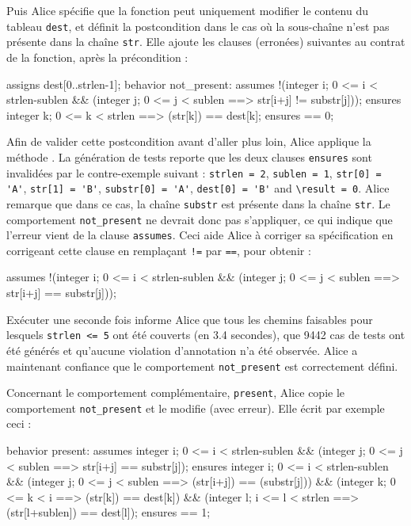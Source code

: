 Puis Alice spécifie que la fonction peut uniquement modifier le contenu du
tableau \lstinline'dest', et définit la postcondition dans le cas où la
sous-chaîne n'est pas présente dans la chaîne \lstinline'str'.
Elle ajoute les clauses (erronées) suivantes au contrat de la fonction, après
la précondition :

\begin{pretty-codeACSL}
assigns dest[0..strlen-1];
behavior not_present:
 assumes !(\exists integer i; 0 <= i < strlen-sublen && 
  (\forall integer j; 0 <= j < sublen ==> str[i+j] != substr[j]));
 ensures \forall integer k; 0 <= k < strlen ==> \old(str[k]) == dest[k];
 ensures \result == 0;
\end{pretty-codeACSL}

Afin de valider cette postcondition avant d'aller plus loin, Alice applique
la méthode \NCD.
La génération de tests reporte que les deux clauses \lstinline{ensures} sont
invalidées par le contre-exemple suivant :
\lstinline{strlen = 2}, \lstinline{sublen = 1}, \lstinline{str[0] = 'A'},
\lstinline{str[1] = 'B'}, \lstinline{substr[0] = 'A'}, 
\lstinline{dest[0] = 'B'} and \lstinline{\result = 0}.
Alice remarque que dans ce cas, la chaîne \lstinline{substr} est présente dans
la chaîne \lstinline'str'.
Le comportement \lstinline'not_present' ne devrait donc pas s'appliquer, ce qui
indique que l'erreur vient de la clause \lstinline'assumes'.
Ceci aide Alice à corriger sa spécification en corrigeant cette clause en
remplaçant \lstinline[style=pretty-c]{!=} par \lstinline{==}, pour obtenir :

\begin{pretty-codeACSL}
  assumes !(\exists integer i; 0 <= i < strlen-sublen && 
   (\forall integer j; 0 <= j < sublen ==> str[i+j] == substr[j]));
\end{pretty-codeACSL}

Exécuter \NCD une seconde fois informe Alice que tous les chemins faisables pour
lesquels \lstinline{strlen <= 5} ont été couverts (en 3.4 secondes), que 9442
cas de tests ont été générés et qu'aucune violation d'annotation n'a été
observée.
Alice a maintenant confiance que le comportement \lstinline'not_present' est
correctement défini.

Concernant le comportement complémentaire, \lstinline{present}, Alice copie le
comportement \lstinline{not_present} et le modifie (avec erreur).
Elle écrit par exemple ceci :

\begin{pretty-codeACSL}
behavior present:
 assumes \exists integer i; 0 <= i < strlen-sublen && 
  (\forall integer j; 0 <= j < sublen ==> str[i+j] == substr[j]);
 ensures \exists integer i; 0 <= i < strlen-sublen &&
  (\forall integer j; 0 <= j < sublen ==> \old(str[i+j]) == \old(substr[j])) &&
  (\forall integer k; 0 <= k < i ==> \old(str[k]) == dest[k]) &&
  (\forall integer l; i <= l < strlen ==> \old(str[l+sublen]) == dest[l]);
 ensures \result == 1;
\end{pretty-codeACSL}

